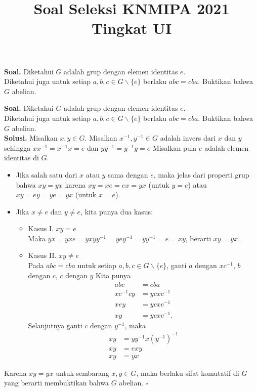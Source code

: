 \documentclass{extarticle}
\title{Soal Seleksi KNMIPA 2021 Tingkat UI}
\date{}
\begin{document}
	\maketitle

		 \textbf{Soal. }Diketahui $G$ adalah grup dengan elemen identitas $e$.\\ Diketahui juga untuk setiap $a,b,c \in G \backslash \{e\}$ berlaku $abc=cba$. Buktikan bahwa $G$ abelian.
	
	\newpage
	
	\textbf{Soal. }Diketahui $G$ adalah grup dengan elemen identitas $e$.\\ Diketahui juga untuk setiap $a,b,c \in G \backslash \{e\}$ berlaku $abc=cba$. Buktikan bahwa $G$ abelian.\\
	
	\textbf{Solusi. } Misalkan $x,y \in G$. Misalkan $x^{-1},y^{-1}\in G$ adalah invers dari $x$ dan $y$ sehingga $xx^{-1} = x^{-1}x=e$ dan $yy^{-1}=y^{-1}y=e$ Misalkan pula $e$ adalah elemen identitas di $G$.
	 \begin{itemize}
	 	\item Jika salah satu dari $x$ atau $y$ sama dengan $e$, maka jelas dari properti grup bahwa $xy = yx$ karena $xy = xe = ex = yx$ (untuk $y=e$) atau $xy = ey = ye = yx$ (untuk $x=e$). 
	 	\item Jika $x \neq e$ dan $y \neq e$, kita punya dua kasus:
	 	\begin{itemize}
	 		\item Kasus I. $xy = e$\\ Maka $yx = yxe = yxyy^{-1} = yey^{-1} = yy^{-1} = e = xy$, berarti $xy = yx$.
	 		\item Kasus II. $xy \neq e$\\Pada $abc = cba$ untuk setiap $a,b,c \in G\backslash\{e\}$, ganti $a$ dengan $xc^{-1}$, $b$ dengan $c$, $c$ dengan $y$ Kita punya \begin{align*}
	 			abc &= cba\\
	 			xc^{-1}cy &= ycxc^{-1}\\
	 			xey &= ycxc^{-1}\\
	 			xy &= ycxc^{-1}.
	 		\end{align*}
 		Selanjutnya ganti $c$ dengan $y^{-1}$, maka
 		\begin{align*}
 			xy &= yy^{-1}x(y^{-1})^{-1}\\
 			xy &= exy\\
 			xy &= yx
 		\end{align*}
	 	\end{itemize}
	 \end{itemize}
	Karena $xy = yx$ untuk sembarang $x,y\in G$, maka berlaku sifat komutatif di $G$ yang berarti membuktikan bahwa $G$ abelian. $\square$
\end{document}
